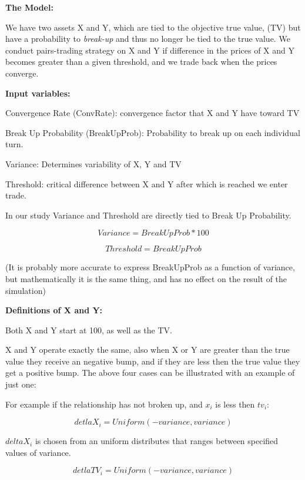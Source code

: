 \documentclass[11pt]{report}
\begin{document}
\textbf{The Model:}

We have two assets X and Y, which are tied to the objective true value, (TV) but have a probability to  \textit{break-up} and thus no longer be tied to the true value. We conduct pairs-trading strategy on X and Y if difference in the prices of X and Y becomes greater than a given threshold, and we trade back when the prices converge.

\textbf{Input variables:}

Convergence Rate (ConvRate): convergence factor that X and Y have toward TV

Break Up Probability (BreakUpProb): Probability to break up on each individual turn.

Variance: Determines variability of X, Y and TV

Threshold: critical difference between X and Y after which is reached we enter trade.

In our study Variance and Threshold are directly tied to Break Up Probability.

\begin{equation}
Variance = BreakUpProb * 100
\end{equation}

\begin{equation}
Threshold = BreakUpProb
\end{equation}

(It is probably more accurate to express BreakUpProb as a function of variance, but mathematically it is the same thing, and has no effect on the result of the simulation)

\textbf{Definitions of X and Y:}

Both X and Y start at 100, as well as the TV. 

X and Y operate exactly the same, also when X or Y are greater than the true value they receive an negative bump, and if they are less then the true value they get a positive bump. The above four cases can be illustrated with an example of just one:

For example if the relationship has not broken up, and $x_i$ is less then $tv_i$:

\begin{equation}
detlaX_i = Uniform(-variance, variance)
\end{equation}

$deltaX_i$ is chosen from an uniform distributes that ranges between specified values of variance.

\begin{equation}
detlaTV_i = Uniform(-variance, variance)
\end{equation}
\end{document}
